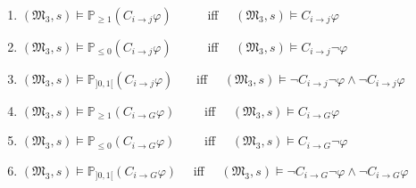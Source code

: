 \begin{theorem}  \label{theorem:Commitment-Equivelances} ~

\begin{enumerate}
\item $(\mathfrak{M_3},s)\models \mathbb{P}_{\geq1} (C_{i \rightarrow
j}\varphi)$ ~~~~~iff~~ $(\mathfrak{M_3},s)\models C_{i \rightarrow
j}\varphi$

\item $(\mathfrak{M_3},s)\models \mathbb{P}_{\leq0} (C_{i \rightarrow
j}\varphi)$ ~~~~~iff~~ $(\mathfrak{M_3},s)\models C_{i \rightarrow
j}\neg \varphi$

\item $(\mathfrak{M_3},s)\models \mathbb{P}_{]0,1[} (C_{i \rightarrow
j}\varphi)$ ~~~iff~~ $(\mathfrak{M_3},s)\models \neg C_{i
\rightarrow j}\neg\varphi \wedge \neg C_{i \rightarrow j}\varphi$

\item $(\mathfrak{M_3},s)\models \mathbb{P}_{\geq1} (C_{i \rightarrow
G}\varphi)$ ~~~~iff~~ $(\mathfrak{M_3},s)\models C_{i \rightarrow
G}\varphi$

\item $(\mathfrak{M_3},s)\models \mathbb{P}_{\leq0} (C_{i \rightarrow
G}\varphi)$ ~~~~iff~~ $(\mathfrak{M_3},s)\models C_{i \rightarrow
G}\neg \varphi$

\item $(\mathfrak{M_3},s)\models \mathbb{P}_{]0,1[} (C_{i \rightarrow
G}\varphi)$ ~~iff~~ $(\mathfrak{M_3},s)\models \neg C_{i
\rightarrow G}\neg\varphi \wedge \neg C_{i \rightarrow G}\varphi$

\end{enumerate}

\end{theorem}


